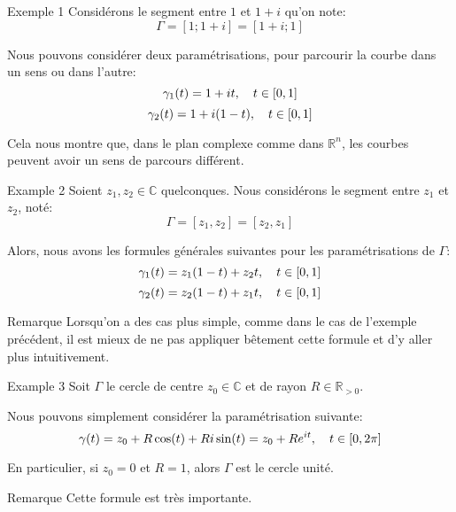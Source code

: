 \documentclass[a4paper]{article}
\begin{document}
\begin{parag}{Exemple 1}
    Considérons le segment entre $1$ et $1+i$ qu'on note: 
    \[\Gamma = \left[1; 1 + i\right] = \left[1+i; 1\right]\]
    
    Nous pouvons considérer deux paramétrisations, pour parcourir la courbe dans un sens ou dans l'autre:
    \[\gamma_1\left(t\right) = 1 + it, \mathspace t \in \left[0, 1\right]\] 
    \[\gamma_2\left(t\right) = 1 + i\left(1 - t\right), \mathspace t \in \left[0, 1\right]\]
    
    Cela nous montre que, dans le plan complexe comme dans $\mathbb{R}^n$, les courbes peuvent avoir un sens de parcours différent.
\end{parag}

\begin{parag}{Example 2}
    Soient $z_1, z_2 \in \mathbb{C}$ quelconques. Nous considérons le segment entre $z_1$ et $z_2$, noté: 
    \[\Gamma = \left[z_1, z_2\right] = \left[z_2, z_1\right]\]
    
    Alors, nous avons les formules générales suivantes pour les paramétrisations de $\Gamma$: 
    \[\gamma_1\left(t\right) = z_1 \left(1 -t\right) + z_2 t, \mathspace t \in \left[0, 1\right]\]
    \[\gamma_2\left(t\right) = z_2\left(1- t\right) + z_1 t, \mathspace t \in \left[0, 1\right]\]

    \begin{subparag}{Remarque}
        Lorsqu'on a des cas plus simple, comme dans le cas de l'exemple précédent, il est mieux de ne pas appliquer bêtement cette formule et d'y aller plus intuitivement.
    \end{subparag}
\end{parag}

\begin{parag}{Example 3}
    Soit $\Gamma$ le cercle de centre $z_0 \in \mathbb{C}$ et de rayon $R \in \mathbb{R}_{> 0}$. 

    Nous pouvons simplement considérer la paramétrisation suivante:
    \[\gamma\left(t\right) = z_0 + R\cos\left(t\right) + Ri\sin\left(t\right) = z_0 + Re^{it}, \mathspace t \in \left[0, 2\pi\right]\]

    En particulier, si $z_0 = 0$ et $R = 1$, alors $\Gamma$ est le cercle unité.

    \begin{subparag}{Remarque}
        Cette formule est très importante.
    \end{subparag}
\end{parag}
\end{document}

